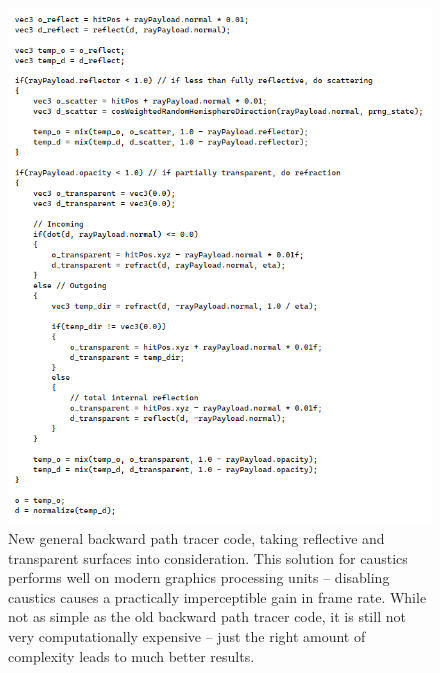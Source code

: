 \documentclass[12pt]{article}
\begin{document}
\begin{figure} 
\centering
  \includegraphics[width = 6 in]{fig4.png}
  \caption{ New general backward path tracer code, taking reflective and transparent surfaces into consideration.
This solution for caustics performs well on modern graphics processing units -- disabling caustics causes a practically imperceptible gain in frame rate.
While not as simple as the old backward path tracer code, it is still not very computationally expensive -- just the right amount of complexity leads to much better results.
}
\end{figure}
\end{document}
